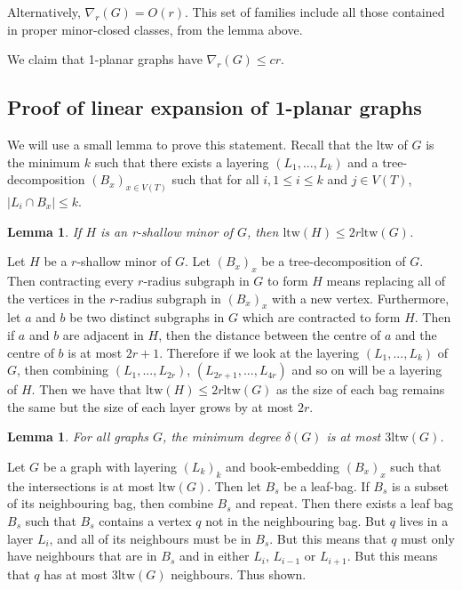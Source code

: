 \documentclass[]{article}
\newcommand{\ltw}{\text{ltw}}
\newtheorem{lemma}[theorem]{Lemma}
\theoremstyle{definition}
\numberwithin{theorem}{section}
\numberwithin{equation}{section}
\begin{document}
Alternatively, $\nabla_r(G) = O(r)$. 
This set of families include all those contained in proper minor-closed classes, from the lemma above. 

We claim that 1-planar graphs have $\nabla_r(G) \leq cr$. 

\subsection{Proof of linear expansion of 1-planar graphs}

We will use a small lemma to prove this statement. Recall that the ltw of $G$ is the minimum $k$ such that there exists a layering $(L_1, ..., L_k)$ and a tree-decomposition $(B_x)_{x \in V(T)}$ such that for all $i, 1 \leq i \leq k$ and $j \in V(T)$, $|L_i \cap B_x | \leq k$. 

\begin{lemma}
	If $H$ is an r-shallow minor of $G$, then $\ltw(H) \leq 2 r \ltw(G)$. 
\end{lemma}

Let $H$ be a $r$-shallow minor of $G$. Let $(B_x)_x$ be a tree-decomposition of $G$. Then contracting every $r$-radius subgraph in $G$ to form $H$ means replacing all of the vertices in the $r$-radius subgraph in $(B_x)_x$ with a new vertex. Furthermore, let $a$ and $b$ be two distinct subgraphs in $G$ which are contracted to form $H$. Then if $a$ and $b$ are adjacent in $H$, then the distance between the centre of $a$ and the centre of $b$ is at most $2r + 1$. Therefore if we look at the layering $(L_1, ..., L_k)$ of $G$, then combining $(L_1, ..., L_{2r})$, $(L_{2r + 1}, ... , L_{4r})$ and so on will be a layering of $H$. Then we have that $\ltw(H) \leq 2r \ltw(G)$ as the size of each bag remains the same but the size of each layer grows by at most $2r$. 

\begin{lemma}
	For all graphs $G$, the minimum degree $\delta(G)$ is at most $3 \ltw(G)$.
\end{lemma}
Let $G$ be a graph with layering $(L_k)_k$ and book-embedding $(B_x)_x$ such that the intersections is at most $\ltw(G)$. Then let $B_s$ be a leaf-bag. If $B_s$ is a subset of its neighbouring bag, then combine $B_s$ and repeat. Then there exists a leaf bag $B_s$ such that $B_s$ contains a vertex $q$ not in the neighbouring bag. But $q$ lives in a layer $L_i$, and all of its neighbours must be in $B_s$. But this means that $q$ must only have neighbours that are in $B_s$ and in either $L_i$, $L_{i - 1}$ or $L_{i + 1}$. But this means that $q$ has at most $3 \ltw(G)$ neighbours. Thus shown.
\end{document}
